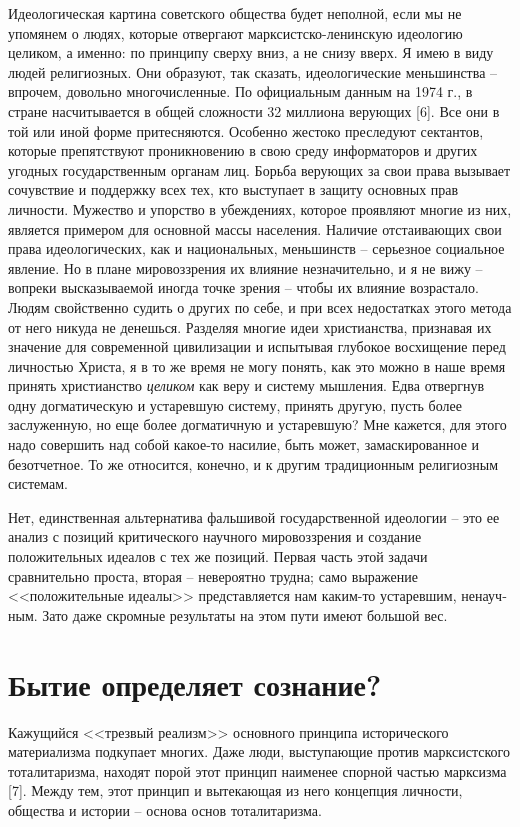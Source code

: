 \documentclass{book}
\begin{document}
Идеологическая картина советского общества будет непол­ной, если мы не упомянем о людях, которые отвергают марксистско-ленинскую 
идеологию целиком, а именно: по принци­пу сверху вниз, а не снизу вверх. Я имею в виду людей религи­озных. Они образуют, так 
сказать, идеологические меньшинст­ва -- впрочем, довольно многочисленные. По официальным данным на 1974 г., в стране 
насчитывается в общей сложно­сти 32 миллиона верующих [6]. Все они в той или иной форме притесняются. Особенно жестоко преследуют 
сектантов, кото­рые препятствуют проникновению в свою среду информато­ров и других угодных государственным органам лиц. Борьба 
верующих за свои права вызывает сочувствие и поддержку всех тех, кто выступает в защиту основных прав личности. Мужество и 
упорство в убеждениях, которое проявляют мно­гие из них, является примером для основной массы населения. Наличие отстаивающих 
свои права идеологических, как и на­циональных, меньшинств -- серьезное социальное явление. Но в плане мировоззрения их влияние 
незначительно, и я не вижу -- вопреки высказываемой иногда точке зрения -- чтобы их влияние возрастало. Людям свойственно судить 
о других по себе, и при всех недостатках этого метода от него никуда не денешься. Разделяя многие идеи христианства, признавая 
их значение для современной цивилизации и испытывая глубокое восхищение перед личностью Христа, я в то же время не могу по­нять, 
как это можно в наше время принять христианство \textit{цели­ком} как веру и систему мышления. Едва отвергнув одну догма­тическую 
и устаревшую систему, принять другую, пусть более заслуженную, но еще более догматичную и устаревшую? Мне кажется, для этого 
надо совершить над собой какое-то наси­лие, быть может, замаскированное и безотчетное. То же относится, конечно, и к другим 
традиционным религиозным системам.

Нет, единственная альтернатива фальшивой государственной идеологии -- это ее анализ с позиций критического научного 
мировоззрения и создание положительных идеалов с тех же позиций. Первая часть этой задачи сравнительно проста, вто­рая -- 
невероятно трудна; само выражение <<положительные идеалы>> представляется нам каким-то устаревшим, ненауч­ным. Зато даже скромные 
результаты на этом пути имеют большой вес.



\section{Бытие определяет сознание?}

Кажущийся <<трезвый реализм>> основного принципа исто­рического материализма подкупает многих. Даже люди, высту­пающие против 
марксистского тоталитаризма, находят порой этот принцип наименее спорной частью марксизма [7]. Между тем, этот принцип и 
вытекающая из него концепция личности, общества и истории -- основа основ тоталитаризма.
\end{document}
